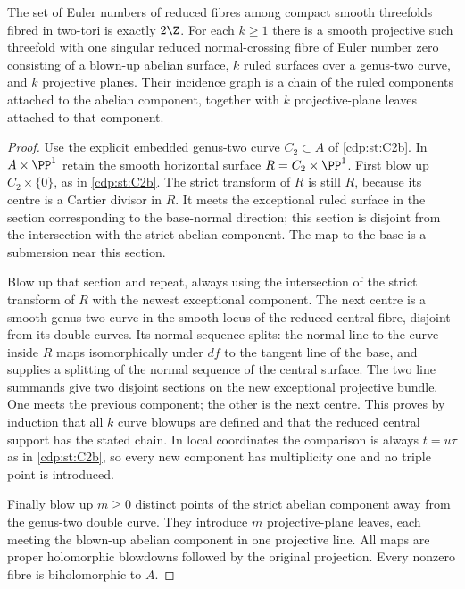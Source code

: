 
\begin{proposition}\label{cdp:st:C.2.UN.2}
The set of Euler numbers of reduced fibres among compact smooth
threefolds fibred in two-tori is exactly $2\Z$. For each $k\ge1$
there is a smooth projective such threefold with one singular reduced
normal-crossing fibre of Euler number zero consisting of a blown-up
abelian surface, $k$ ruled surfaces over a genus-two curve, and $k$
projective planes. Their incidence graph is a chain of the ruled
components attached to the abelian component, together with $k$
projective-plane leaves attached to that component.
\end{proposition}
\begin{proof}
Use the explicit embedded genus-two curve $C_2\subset A$ of \ref{cdp:st:C2b}.
In $A\times\PP^1$ retain the smooth horizontal surface
$R=C_2\times\PP^1$. First blow up $C_2\times\{0\}$, as in \ref{cdp:st:C2b}.
The strict transform of $R$ is still $R$, because its centre is a
Cartier divisor in $R$. It meets the exceptional ruled surface in
the section corresponding to the base-normal direction; this
section is disjoint from the intersection with the strict abelian
component. The map to the base is a submersion near this section.

Blow up that section and repeat, always using the intersection of
the strict transform of $R$ with the newest exceptional component.
The next centre is a smooth genus-two curve in the smooth locus of
the reduced central fibre, disjoint from its double curves. Its
normal sequence splits: the normal line to the curve inside $R$
maps isomorphically under $df$ to the tangent line of the base,
and supplies a splitting of the normal sequence of the central
surface. The two line summands give two disjoint sections on the
new exceptional projective bundle. One meets the previous
component; the other is the next centre. This proves by induction
that all $k$ curve blowups are defined and that the reduced central
support has the stated chain. In local coordinates the comparison
is always $t=u\tau$ as in \ref{cdp:st:C2b}, so every new component has
multiplicity one and no triple point is introduced.

Finally blow up $m\ge0$ distinct points of the strict abelian
component away from the genus-two double curve. They introduce
$m$ projective-plane leaves, each meeting the blown-up abelian
component in one projective line. All maps are proper holomorphic
blowdowns followed by the original projection. Every nonzero
fibre is biholomorphic to $A$.


\end{proof}
